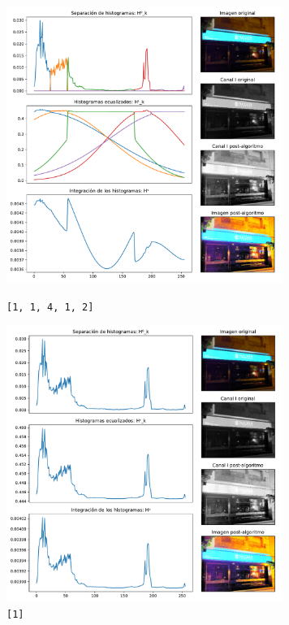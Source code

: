 \begin{figure}[H]
\begin{minipage}[c]{0.48\linewidth}
  \includegraphics[height=9cm]{imgs/backlightnacion-11412.pdf}
  \caption{\texttt{[1, 1, 4, 1, 2]}}
\end{minipage}
\hfill
\begin{minipage}[c]{0.48\linewidth}
  \includegraphics[height=9cm]{imgs/backlightnacion-1.pdf}
  \caption{\texttt{[1]}}
\end{minipage}%
\end{figure}

